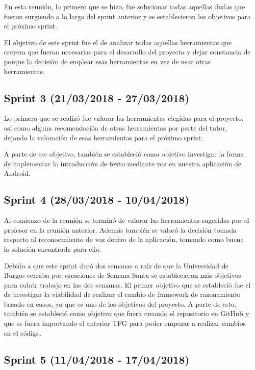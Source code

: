 En esta reunión, lo primero que se hizo, fue solucionar todas aquellas dudas que fueron surgiendo a lo largo del sprint anterior y se establecieron los objetivos para el próximo sprint.

El objetivo de este sprint fue el de analizar todas aquellas herramientas que creyera que fueran necesarias para el desarrollo del proyecto y dejar constancia de porque la decisión de emplear esas herramientas en vez de usar otras herramientas.

\subsection{Sprint 3 (21/03/2018 - 27/03/2018)}

Lo primero que se realizó fue valorar las herramientas elegidas para el proyecto, así como alguna recomendación de otras herramientas por parte del tutor, dejando la valoración de esas herramientas para el próximo sprint.

A parte de ese objetivo, también se estableció como objetivo investigar la forma de implementar la introducción de texto mediante voz en nuestra aplicación de Android.

\subsection{Sprint 4 (28/03/2018 - 10/04/2018)}

Al comienzo de la reunión se terminó de valorar las herramientas sugeridas por el profesor en la reunión anterior. Además también se valoró la decisión tomada respecto al reconocimiento de voz dentro de la aplicación, tomando como buena la solución encontrada para ello.

Debido a que este sprint duró dos semanas a raíz de que la Universidad de Burgos cerraba por vacaciones de Semana Santa se establecieron más objetivos para cubrir trabajo en las dos semanas. El primer objetivo que se estableció fue el de investigar la viabilidad de realizar el cambio de framework de razonamiento basado en casos, ya que es uno de los objetivos del proyecto. A parte de esto, también se estableció como objetivo que fuera 
creando el repositorio en GitHub y que se fuera importando el anterior TFG para poder empezar a realizar cambios en el código.

\subsection{Sprint 5 (11/04/2018 - 17/04/2018)}

